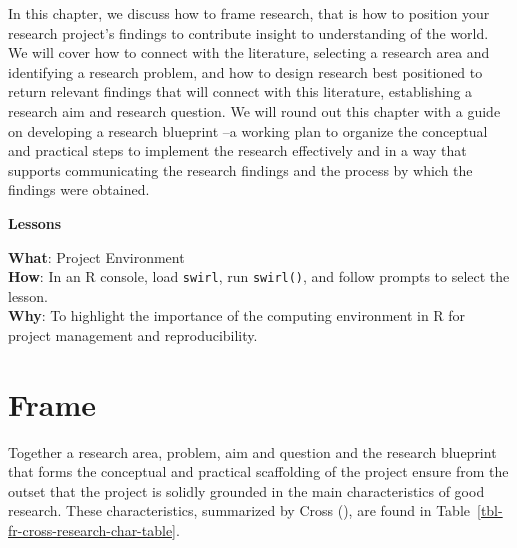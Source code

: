 \documentclass[
  letterpaper,
]{latex/krantz}
\theoremstyle{definition}
\theoremstyle{remark}
\begin{document}
In this chapter, we discuss how to frame research, that is how to
position your research project's findings to contribute insight to
understanding of the world. We will cover how to connect with the
literature, selecting a research area and identifying a research
problem, and how to design research best positioned to return relevant
findings that will connect with this literature, establishing a research
aim and research question. We will round out this chapter with a guide
on developing a research blueprint --a working plan to organize the
conceptual and practical steps to implement the research effectively and
in a way that supports communicating the research findings and the
process by which the findings were obtained.

\begin{tcolorbox}[enhanced jigsaw, breakable, leftrule=.75mm, arc=.35mm, colframe=quarto-callout-color-frame, colback=white, left=2mm, bottomrule=.15mm, rightrule=.15mm, toprule=.15mm, opacityback=0]

\textbf{ Lessons}

\textbf{What}: Project Environment\\
\textbf{How}: In an R console, load \texttt{swirl}, run
\texttt{swirl()}, and follow prompts to select the lesson.\\
\textbf{Why}: To highlight the importance of the computing environment
in R for project management and reproducibility.

\end{tcolorbox}

\section{Frame}\label{sec-fr-frame}

Together a research area, problem, aim and question and the research
blueprint that forms the conceptual and practical scaffolding of the
project ensure from the outset that the project is solidly grounded in
the main characteristics of good research. These characteristics,
summarized by Cross (), are found in
Table~\ref{tbl-fr-cross-research-char-table}.
\end{document}
